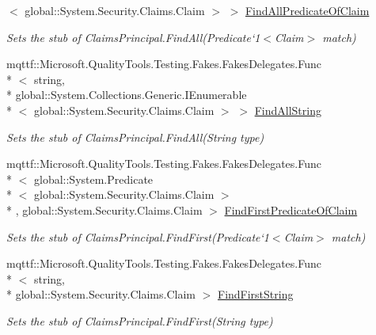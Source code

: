 \begin{DoxyCompactItemize}
$<$ global\-::\-System.\-Security.\-Claims.\-Claim $>$ $>$ \hyperlink{class_system_1_1_security_1_1_principal_1_1_fakes_1_1_stub_generic_principal_a1ac81142558efe2dd431bd8b53f7a49d}{Find\-All\-Predicate\-Of\-Claim}
\begin{DoxyCompactList}\small\item\em Sets the stub of Claims\-Principal.\-Find\-All(Predicate`1$<$Claim$>$ match)\end{DoxyCompactList}\item 
mqttf\-::\-Microsoft.\-Quality\-Tools.\-Testing.\-Fakes.\-Fakes\-Delegates.\-Func\\*
$<$ string, \\*
global\-::\-System.\-Collections.\-Generic.\-I\-Enumerable\\*
$<$ global\-::\-System.\-Security.\-Claims.\-Claim $>$ $>$ \hyperlink{class_system_1_1_security_1_1_principal_1_1_fakes_1_1_stub_generic_principal_a03c3bbde7a249219ef4406e40f577b3b}{Find\-All\-String}
\begin{DoxyCompactList}\small\item\em Sets the stub of Claims\-Principal.\-Find\-All(\-String type)\end{DoxyCompactList}\item 
mqttf\-::\-Microsoft.\-Quality\-Tools.\-Testing.\-Fakes.\-Fakes\-Delegates.\-Func\\*
$<$ global\-::\-System.\-Predicate\\*
$<$ global\-::\-System.\-Security.\-Claims.\-Claim $>$\\*
, global\-::\-System.\-Security.\-Claims.\-Claim $>$ \hyperlink{class_system_1_1_security_1_1_principal_1_1_fakes_1_1_stub_generic_principal_ad47fb8ab637eeb188eaaa82439b2382c}{Find\-First\-Predicate\-Of\-Claim}
\begin{DoxyCompactList}\small\item\em Sets the stub of Claims\-Principal.\-Find\-First(Predicate`1$<$Claim$>$ match)\end{DoxyCompactList}\item 
mqttf\-::\-Microsoft.\-Quality\-Tools.\-Testing.\-Fakes.\-Fakes\-Delegates.\-Func\\*
$<$ string, \\*
global\-::\-System.\-Security.\-Claims.\-Claim $>$ \hyperlink{class_system_1_1_security_1_1_principal_1_1_fakes_1_1_stub_generic_principal_a6da74d9f72399059a50d415089886003}{Find\-First\-String}
\begin{DoxyCompactList}\small\item\em Sets the stub of Claims\-Principal.\-Find\-First(\-String type)\end{DoxyCompactList}\item 

\end{DoxyCompactItemize}
